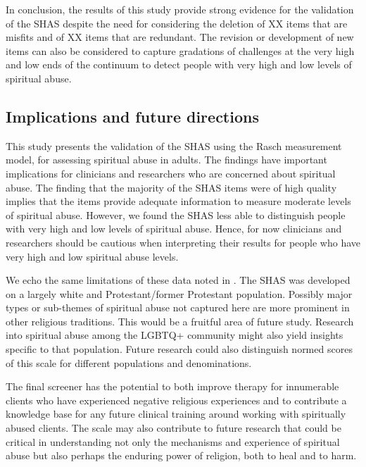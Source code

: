 \documentclass[
]{article}
\begin{document}
In conclusion, the results of this study provide strong evidence for the validation of the SHAS despite the need for considering the deletion of XX items that are misfits and of XX items that are redundant. The revision or development of new items can also be considered to capture gradations of challenges at the very high and low ends of the continuum to detect people with very high and low levels of spiritual abuse.

\hypertarget{implications-and-future-directions}{%
\subsection{Implications and future directions}\label{implications-and-future-directions}}

This study presents the validation of the SHAS using the Rasch measurement model, for assessing spiritual abuse in adults. The findings have important implications for clinicians and researchers who are concerned about spiritual abuse. The finding that the majority of the SHAS items were of high quality implies that the items provide adequate information to measure moderate levels of spiritual abuse. However, we found the SHAS less able to distinguish people with very high and low levels of spiritual abuse. Hence, for now clinicians and researchers should be cautious when interpreting their results for people who have very high and low spiritual abuse levels.

We echo the same limitations of these data noted in \citet{KochEdstrom2022}. The SHAS was developed on a largely white and Protestant/former Protestant population. Possibly major types or sub-themes of spiritual abuse not captured here are more prominent in other religious traditions. This would be a fruitful area of future study. Research into spiritual abuse among the LGBTQ+ community might also yield insights specific to that population. Future research could also distinguish normed scores of this scale for different populations and denominations.

The final screener has the potential to both improve therapy for innumerable clients who have experienced negative religious experiences and to contribute a knowledge base for any future clinical training around working with spiritually abused clients. The scale may also contribute to future research that could be critical in understanding not only the mechanisms and experience of spiritual abuse but also perhaps the enduring power of religion, both to heal and to harm.
\end{document}
